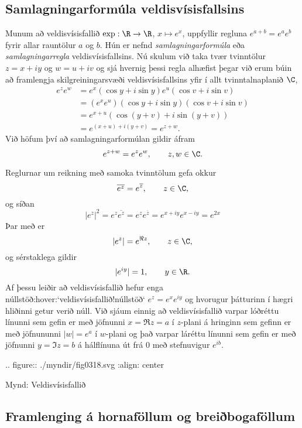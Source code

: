 \subsection*{Samlagningarformúla veldisvísisfallsins}

Munum að veldisvísisfallið $\exp: \R\to \R$,  $x\mapsto e^x$, uppfyllir
regluna $e^{a+b}=e^ae^b$ fyrir allar rauntölur $a$ og $b$.  
Hún er nefnd {\it samlagningarformúla } eða {\it samlagningarregla}
veldisvísisfallsins.
Nú  skulum við taka tvær tvinntölur $z=x+iy$ og $w=u+iv$ og sjá hvernig
þessi regla alhæfist þegar við erum búin að framlengja
skilgreiningarsvæði veldisvísisfallsins yfir í allt tvinntalnaplanið
$\C$,
\begin{align*}
e^ze^w &=e^x(\cos y+i\sin y)e^u(\cos v+i\sin v) \\
 & =(e^xe^u)(\cos y+i\sin y)(\cos v+i\sin v) \\
 & =e^{x+u}(\cos(y+v)+i\sin (y+v))\\
 & =e^{(x+u)+i(y+v)}=e^{z+w}.
\end{align*}
Við höfum því að samlagningarformúlan gildir áfram
$$
e^{z+w}=e^ze^w, \qquad z,w\in \C.
$$


Reglurnar um reikning með samoka tvinntölum gefa
okkur
$$\overline{e^z}=e^{\overline z},\qquad z\in \C,
$$
og síðan
 $$|e^z|^2=e^z\overline{e^{z}}=e^ze^{\overline z}=e^{x+iy}e^{x-iy}=e^{2x}
 $$
Þar með er
 $$|e^z|=e^{\Re z}, \qquad z\in \C,
 $$
og sérstaklega gildir 
$$
|e^{iy}|=1, \qquad y\in \R.
$$
Af þessu leiðir  að veldisvísisfallið hefur enga
núllstöð:hover:`veldisvísisfallið!núllstöð`
$e^z=e^xe^{iy}$ og  hvorugur þátturinn í hægri hliðinni getur verið
núll.  Við sjáum einnig að veldisvísisfallið varpar lóðréttu línunni
sem gefin er með jöfnunni 
$x=\Re z=a$ í $z$-plani á hringinn sem gefinn er með jöfnununni 
$|w|=e^a$ í $w$-plani og það varpar
láréttu línunni sem gefin er með jöfnunni  $y=\Im z=b$ á hálflínuna
út frá $0$ með stefnuvigur $e^{ib}$.  

.. figure:: ./myndir/fig0318.svg
    :align: center

    Mynd: Veldisvísisfallið





\subsection*{Framlenging á hornaföllum og breiðbogaföllum}

